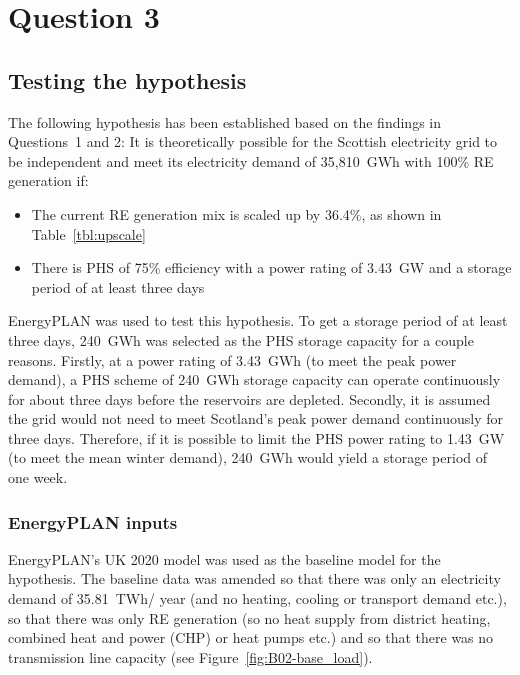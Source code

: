 \section{Question 3}



\subsection{Testing the hypothesis}

The following hypothesis has been established based on the findings in Questions~1 and 2:
It is theoretically possible for the Scottish electricity grid to be independent and meet its electricity demand of 35,810~GWh with 100\% RE generation if:
\begin{itemize}
	\item The current RE generation mix is scaled up by 36.4\%, as shown in Table~\ref{tbl:upscale}
	\item There is PHS of 75\% efficiency with a power rating of 3.43~GW and a storage period of at least three days
\end{itemize}

EnergyPLAN was used to test this hypothesis.
To get a storage period of at least three days, 240~GWh was selected as the PHS storage capacity for a couple reasons.
Firstly, at a power rating of 3.43~GWh (to meet the peak power demand), a PHS scheme of 240~GWh storage capacity can operate continuously for about three days before the reservoirs are depleted.
Secondly, it is assumed the grid would not need to meet Scotland's peak power demand continuously for three days.
Therefore, if it is possible to limit the PHS power rating to 1.43~GW (to meet the mean winter demand), 240~GWh would yield a storage period of one week.



\subsubsection{EnergyPLAN inputs}

EnergyPLAN's UK 2020 model \citep{EnergyPLAN_UK2020} was used as the baseline model for the hypothesis.
The baseline data was amended so that there was only an electricity demand of 35.81~TWh/ year (and no heating, cooling or transport demand etc.), so that there was only RE generation (so no heat supply from district heating, combined heat and power (CHP) or heat pumps etc.) and so that there was no transmission line capacity (see Figure~\ref{fig:B02-base_load}).

